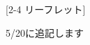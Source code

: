\newpage
\pagestyle{leaflet}
[2-4 リーフレット]
\begin{multicols*}{2}
\begin{center}
    {\selectsize{13pt}{13pt}5/20に追記します}
\end{center}
\end{multicols*}